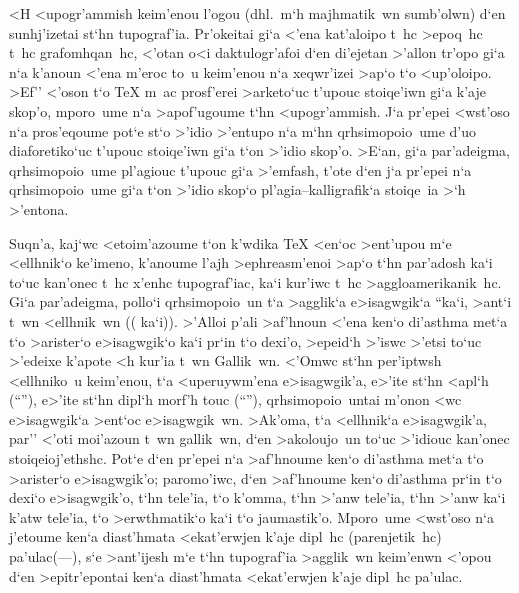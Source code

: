
<H <upogr'ammish keim'enou l'ogou (dhl.\ m`h majhmatik~wn sumb'olwn) d`en
sunhj'izetai st`hn tupograf'ia.  Pr'okeitai gi`a <'ena kat'aloipo t~hc
>epoq~hc t~hc grafomhqan~hc, <'otan o<i daktulogr'afoi d`en di'ejetan
>'allon tr'opo gi`a n`a k'anoun <'ena m'eroc to~u keim'enou n`a
xeqwr'izei >ap`o t`o <up'oloipo.  >Ef'' <'oson t`o {\rm\TeX} m~ac
prosf'erei >arketo`uc t'upouc stoiqe'iwn gi`a k'aje skop'o, mporo~ume
n`a >apof'ugoume t`hn <upogr'ammish.  J`a pr'epei <wst'oso n`a
pros'eqoume pot`e st`o >'idio >'entupo n`a m`hn qrhsimopoio~ume d'uo
diaforetiko`uc t'upouc stoiqe'iwn gi`a t`on >'idio skop'o.  >E`an, gi`a
par'adeigma, qrhsimopoio~ume pl'agiouc t'upouc gi`a >'emfash, t'ote d`en
j`a pr'epei n`a qrhsimopoio~ume gi`a t`on >'idio skop`o
pl'agia--kalligrafik`a stoiqe~ia >`h >'entona.

Suqn'a, kaj`wc <etoim'azoume t`on k'wdika {\rm\TeX} <en`oc >ent'upou m`e
<ellhnik`o ke'imeno, k'anoume l'ajh >ephreasm'enoi >ap`o t`hn par'adosh
ka`i to`uc kan'onec t~hc x'enhc tupograf'iac, ka`i kur'iwc t~hc
>aggloamerikanik~hc.  Gi`a par'adeigma, pollo`i qrhsimopoio~un t`a
>agglik`a e>isagwgik`a {\rm``}\NB{}ka`i, >ant`i t~wn <ellhnik~wn
(( ka`i\NB)).  >'Alloi p'ali >af'hnoun <'ena ken`o di'asthma met`a t`o
>arister`o e>isagwgik`o ka`i pr`in t`o dexi'o, >epeid`h >'iswc >'etsi
to`uc >'edeixe k'apote <h kur'ia t~wn Gallik~wn.  <'Omwc  st`hn
per'iptwsh <ellhniko~u keim'enou, t`a <uperuywm'ena e>isagwgik'a, e>'ite
st`hn <apl`h (``\NB{}''), e>'ite st`hn dipl`h morf'h touc
({\rm``\NB{}''}), qrhsimopoio~untai m'onon <wc e>isagwgik`a >ent`oc
e>isa\-gwgi\-k~wn.  >Ak'oma, t`a <ellhnik`a e>isagwgik'a, par'' <'oti
moi'azoun t~wn gallik~wn, d`en >ako\-lou\-jo~un to`uc >'idiouc kan'onec
stoiqeioj'ethshc.  Pot`e d`en pr'epei n`a >af'hnoume ken`o di'asthma
met`a t`o >arister`o e>isagwgik'o; paromo'iwc, d`en >af'hnoume ken`o
di'asthma pr`in t`o dexi`o e>isagwgik'o, t`hn tele'ia, t`o k'omma, t`hn
>'anw tele'ia, t`hn >'anw ka`i k'atw tele'ia, t`o >erwthmatik`o ka`i t`o
jaumastik'o.  Mporo~ume <wst'oso n`a j'etoume ken`a diast'hmata
<ekat'erwjen k'aje dipl~hc (parenjetik~hc) pa'ulac\NB{}(---), s`e
>ant'ijesh m`e t`hn tupograf'ia >agglik~wn keim'enwn <'opou d`en
>epitr'epontai ken`a diast'hmata <ekat'erwjen k'aje dipl~hc pa'ulac.

